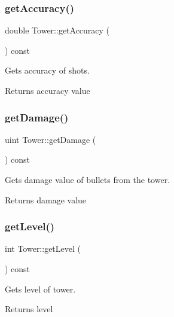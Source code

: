 \subsubsection{\texorpdfstring{get\+Accuracy()}{getAccuracy()}}
{\footnotesize\ttfamily double Tower\+::get\+Accuracy (\begin{DoxyParamCaption}{ }\end{DoxyParamCaption}) const}



Gets accuracy of shots. 

\begin{DoxyReturn}{Returns}
accuracy value 
\end{DoxyReturn}
\mbox{\label{class_tower_a52b934c8b84d0fd9e5d8fbd49f01a5ad}} 
\subsubsection{\texorpdfstring{get\+Damage()}{getDamage()}}
{\footnotesize\ttfamily uint Tower\+::get\+Damage (\begin{DoxyParamCaption}{ }\end{DoxyParamCaption}) const}



Gets damage value of bullets from the tower. 

\begin{DoxyReturn}{Returns}
damage value 
\end{DoxyReturn}
\mbox{\label{class_tower_a4a69796c3c65aeae2d42ef631d69eb6c}} 
\subsubsection{\texorpdfstring{get\+Level()}{getLevel()}}
{\footnotesize\ttfamily int Tower\+::get\+Level (\begin{DoxyParamCaption}{ }\end{DoxyParamCaption}) const}



Gets level of tower. 

\begin{DoxyReturn}{Returns}
level 
\end{DoxyReturn}
\mbox{\label{class_tower_ade2e2de32deefb5112473363911c6e73}} 
